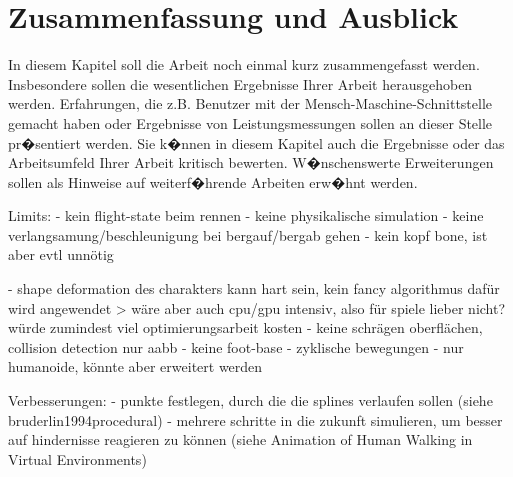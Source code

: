 \chapter{Zusammenfassung und Ausblick}

In diesem Kapitel soll die Arbeit noch einmal kurz zusammengefasst werden. Insbesondere sollen die wesentlichen Ergebnisse Ihrer Arbeit herausgehoben werden. Erfahrungen, die z.B. Benutzer mit der Mensch-Maschine-Schnittstelle gemacht haben oder Ergebnisse von Leistungsmessungen sollen an dieser Stelle pr�sentiert werden. Sie k�nnen in diesem Kapitel auch die Ergebnisse oder das Arbeitsumfeld Ihrer Arbeit kritisch bewerten. W�nschenswerte Erweiterungen sollen als Hinweise auf weiterf�hrende Arbeiten erw�hnt werden.



Limits:
- kein flight-state beim rennen
- keine physikalische simulation
- keine verlangsamung/beschleunigung bei bergauf/bergab gehen
- kein kopf bone, ist aber evtl unnötig

- shape deformation des charakters kann hart sein, kein fancy algorithmus dafür wird angewendet
> wäre aber auch cpu/gpu intensiv, also für spiele lieber nicht? würde zumindest viel optimierungsarbeit kosten
- keine schrägen oberflächen, collision detection nur aabb
- keine foot-base
- zyklische bewegungen
- nur humanoide, könnte aber erweitert werden

Verbesserungen:
- punkte festlegen, durch die die splines verlaufen sollen (siehe bruderlin1994procedural)
- mehrere schritte in die zukunft simulieren, um besser auf hindernisse reagieren zu können (siehe Animation of Human Walking in Virtual Environments)
